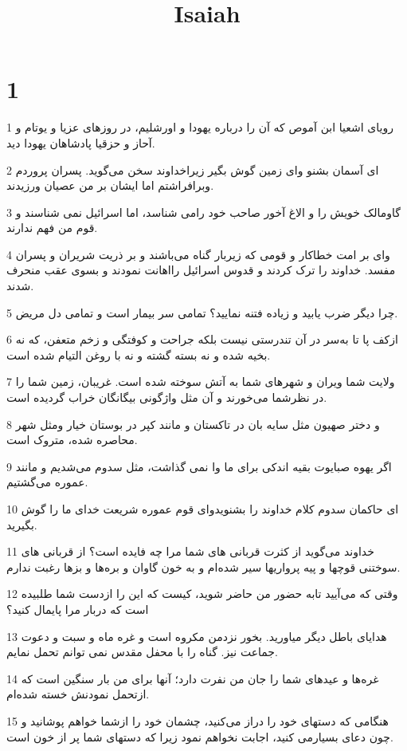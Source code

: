 

\title{Isaiah}

 
\chapter{1}

\par 1 رویای اشعیا ابن آموص که آن را درباره یهودا و اورشلیم، در روزهای عزیا و یوتام و آحاز و حزقیا پادشاهان یهودا دید.
\par 2 ‌ای آسمان بشنو و‌ای زمین گوش بگیر زیراخداوند سخن می‌گوید. پسران پروردم وبرافراشتم اما ایشان بر من عصیان ورزیدند.
\par 3 گاومالک خویش را و الاغ آخور صاحب خود رامی شناسد، اما اسرائیل نمی شناسند و قوم من فهم ندارند.
\par 4 وای بر امت خطاکار و قومی که زیربار گناه می‌باشند و بر ذریت شریران و پسران مفسد. خداوند را ترک کردند و قدوس اسرائیل رااهانت نمودند و بسوی عقب منحرف شدند.
\par 5 چرا دیگر ضرب یابید و زیاده فتنه نمایید؟ تمامی سر بیمار است و تمامی دل مریض.
\par 6 ازکف پا تا به‌سر در آن تندرستی نیست بلکه جراحت و کوفتگی و زخم متعفن، که نه بخیه شده و نه بسته گشته و نه با روغن التیام شده است.
\par 7 ولایت شما ویران و شهرهای شما به آتش سوخته شده است. غریبان، زمین شما را در نظرشما می‌خورند و آن مثل واژگونی بیگانگان خراب گردیده است.
\par 8 و دختر صهیون مثل سایه بان در تاکستان و مانند کپر در بوستان خیار ومثل شهر محاصره شده، متروک است.
\par 9 اگر یهوه صبایوت بقیه اندکی برای ما وا نمی گذاشت، مثل سدوم می‌شدیم و مانند عموره می‌گشتیم.
\par 10 ‌ای حاکمان سدوم کلام خداوند را بشنویدو‌ای قوم عموره شریعت خدای ما را گوش بگیرید.
\par 11 خداوند می‌گوید از کثرت قربانی های شما مرا چه فایده است؟ از قربانی های سوختنی قوچها و پیه پرواریها سیر شده‌ام و به خون گاوان و بره‌ها و بزها رغبت ندارم.
\par 12 وقتی که می‌آیید تابه حضور من حاضر شوید، کیست که این را ازدست شما طلبیده است که دربار مرا پایمال کنید؟
\par 13 هدایای باطل دیگر میاورید. بخور نزدمن مکروه است و غره ماه و سبت و دعوت جماعت نیز. گناه را با محفل مقدس نمی توانم تحمل نمایم.
\par 14 غره‌ها و عیدهای شما را جان من نفرت دارد؛ آنها برای من بار سنگین است که ازتحمل نمودنش خسته شده‌ام.
\par 15 هنگامی که دستهای خود را دراز می‌کنید، چشمان خود را ازشما خواهم پوشانید و چون دعای بسیارمی کنید، اجابت نخواهم نمود زیرا که دستهای شما پر از خون است.

